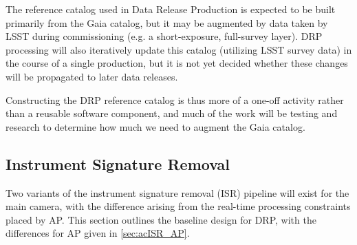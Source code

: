 The reference catalog used in Data Release Production is expected to be built primarily from the Gaia catalog, but it may be augmented by data taken by LSST during commissioning (e.g. a short-exposure, full-survey layer).  DRP processing will also iteratively update this catalog (utilizing LSST survey data) in the course of a single production, but it is not yet decided whether these changes will be propagated to later data releases.

Constructing the DRP reference catalog is thus more of a one-off activity rather than a reusable software component, and much of the work will be testing and research to determine how much we need to augment the Gaia catalog.

\subsection{Instrument Signature Removal}
\label{sec:acISR}

Two variants of the instrument signature removal (ISR) pipeline will exist for the main camera, with the difference arising from the real-time processing constraints placed by AP. This section outlines the baseline design for DRP, with the differences for AP given in \secsymbol\ref{sec:acISR_AP}.



